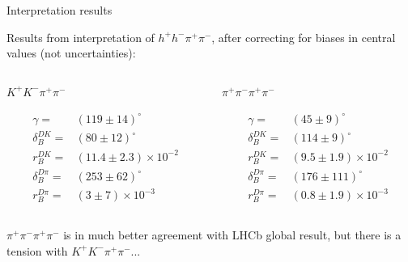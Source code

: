 \documentclass[xcolor={dvipsnames}]{beamer}
\begin{document}
\begin{frame}{Interpretation results}
  \begin{center}
    {\large Results from interpretation of $h^+h^-\pi^+\pi^-$, after correcting for biases in central values (not uncertainties):}
  \end{center}
  \vspace{-0.5cm}
  \begin{columns}
    \begin{column}{0.5\textwidth}
      \begin{center}
        $K^+K^-\pi^+\pi^-$
      \end{center}
      \begin{align*}
        \gamma =& (119 \pm 14)^\circ \\
        \delta_B^{DK} =& (80 \pm 12)^\circ \\
        r_B^{DK} =& (11.4 \pm 2.3)\times10^{-2} \\
        \delta_B^{D\pi} =& (253 \pm 62)^\circ \\
        r_B^{D\pi} =& (3 \pm 7)\times10^{-3}
      \end{align*}
    \end{column}
    \begin{column}{0.5\textwidth}
      \begin{center}
        $\pi^+\pi^-\pi^+\pi^-$
      \end{center}
      \begin{align*}
        \gamma =& (45 \pm 9)^\circ \\
        \delta_B^{DK} =& (114 \pm 9)^\circ \\
        r_B^{DK} =& (9.5 \pm 1.9)\times10^{-2} \\
        \delta_B^{D\pi} =& (176 \pm 111)^\circ \\
        r_B^{D\pi} =& (0.8 \pm 1.9)\times10^{-3}
      \end{align*}
    \end{column}
  \end{columns}
  \vspace{0.3cm}
  \begin{center}
    $\pi^+\pi^-\pi^+\pi^-$ is in much better agreement with LHCb global result, but there is a tension with $K^+K^-\pi^+\pi^-$...\\
    \phantom{...but how Gaussian are these uncertainties?}
  \end{center}
\end{frame}
\end{document}
